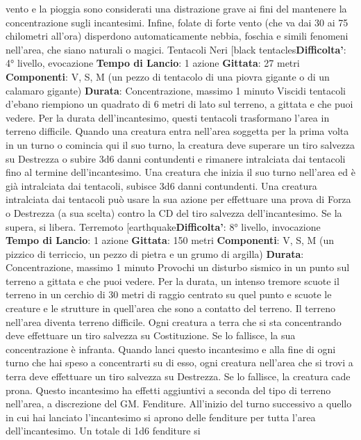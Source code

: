 \begin{multicols}{2}
vento e la pioggia sono considerati una distrazione
grave ai fini del mantenere la concentrazione sugli
incantesimi. Infine, folate di forte vento (che va dai 30 ai
75 chilometri all’ora) disperdono automaticamente
nebbia, foschia e simili fenomeni nell’area, che siano
naturali o magici.
Tentacoli Neri
[black tentacles\textbf{Difficolta'}:
4° livello, evocazione
\textbf{Tempo di Lancio}: 1 azione
\textbf{Gittata}: 27 metri
\textbf{Componenti}: V, S, M (un pezzo di tentacolo di una
piovra gigante o di un calamaro gigante)
\textbf{Durata}: Concentrazione, massimo 1 minuto
Viscidi tentacoli d’ebano riempiono un quadrato di 6
metri di lato sul terreno, a gittata e che puoi vedere. Per
la durata dell’incantesimo, questi tentacoli trasformano
l’area in terreno difficile.
Quando una creatura entra nell’area soggetta per la
prima volta in un turno o comincia qui il suo turno, la
creatura deve superare un tiro salvezza su Destrezza o
subire 3d6 danni contundenti e rimanere intralciata dai
tentacoli fino al termine dell’incantesimo. Una creatura
che inizia il suo turno nell’area ed è già intralciata dai
tentacoli, subisce 3d6 danni contundenti.
Una creatura intralciata dai tentacoli può usare la sua
azione per effettuare una prova di Forza o Destrezza (a
sua scelta) contro la CD del tiro salvezza
dell’incantesimo. Se la supera, si libera.
Terremoto
[earthquake\textbf{Difficolta'}:
8° livello, invocazione
\textbf{Tempo di Lancio}: 1 azione
\textbf{Gittata}: 150 metri
\textbf{Componenti}: V, S, M (un pizzico di terriccio, un pezzo
di pietra e un grumo di argilla)
\textbf{Durata}: Concentrazione, massimo 1 minuto
Provochi un disturbo sismico in un punto sul terreno a
gittata e che puoi vedere. Per la durata, un intenso
tremore scuote il terreno in un cerchio di 30 metri di
raggio centrato su quel punto e scuote le creature e le
strutture in quell’area che sono a contatto del terreno.
Il terreno nell’area diventa terreno difficile. Ogni
creatura a terra che si sta concentrando deve effettuare
un tiro salvezza su Costituzione. Se lo fallisce, la sua
concentrazione è infranta.
Quando lanci questo incantesimo e alla fine di ogni
turno che hai speso a concentrarti su di esso, ogni
creatura nell’area che si trovi a terra deve effettuare un
tiro salvezza su Destrezza. Se lo fallisce, la creatura
cade prona.
Questo incantesimo ha effetti aggiuntivi a seconda del
tipo di terreno nell’area, a discrezione del GM.
Fenditure. All’inizio del turno successivo a quello in cui
hai lanciato l’incantesimo si aprono delle fenditure per
tutta l’area dell’incantesimo. Un totale di 1d6 fenditure si

\end{multicols}
